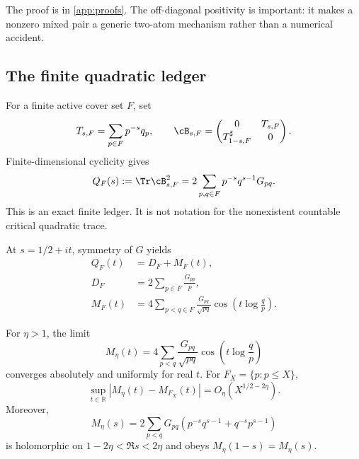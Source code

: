 The proof is in \cref{app:proofs}.  The off-diagonal positivity is important:
it makes a nonzero mixed pair a generic two-atom mechanism rather than a
numerical accident.

\subsection{The finite quadratic ledger}

For a finite active cover set $F$, set
\begin{equation}
 T_{s,F}=\sum_{p\in F}p^{-s}q_p,
 \qquad
 \cB_{s,F}=
 \begin{pmatrix}
 0&T_{s,F}\\ T_{1-s,F}^\sharp&0
 \end{pmatrix}.
 \label{eq:finite-block}
\end{equation}
Finite-dimensional cyclicity gives
\begin{equation}
 Q_F(s):=\Tr\cB_{s,F}^2
 =2\sum_{p,q\in F}p^{-s}q^{s-1}G_{pq}.
 \label{eq:QFs}
\end{equation}
This is an exact finite ledger.  It is not notation for the nonexistent
countable critical quadratic trace.

At $s=1/2+it$, symmetry of $G$ yields
\begin{align}
 Q_F(t)&=D_F+M_F(t),\label{eq:Qsplit}\\
 D_F&=2\sum_{p\in F}\frac{G_{pp}}p,\label{eq:DF}\\
 M_F(t)&=4\sum_{p<q\in F}\frac{G_{pq}}{\sqrt{pq}}
 \cos\!\left(t\log\frac qp\right).
 \label{eq:MF}
\end{align}

\begin{theorem}
\label{thm:mixed-summability}
For $\eta>1$, the limit
\begin{equation}
 M_\eta(t)=4\sum_{p<q}\frac{G_{pq}}{\sqrt{pq}}
 \cos\!\left(t\log\frac qp\right)
 \label{eq:Meta}
\end{equation}
converges absolutely and uniformly for real $t$.  For
$F_X=\{p:p\le X\}$,
\begin{equation}
 \sup_{t\in\mathbb R}|M_\eta(t)-M_{F_X}(t)|
 =O_\eta(X^{1/2-2\eta}).
 \label{eq:mixed-tail}
\end{equation}
Moreover,
\begin{equation}
 M_\eta(s)=2\sum_{p<q}G_{pq}
 \left(p^{-s}q^{s-1}+q^{-s}p^{s-1}\right)
 \label{eq:mixed-holo}
\end{equation}
is holomorphic on $1-2\eta<\Re s<2\eta$ and obeys
$M_\eta(1-s)=M_\eta(s)$.
\end{theorem}

